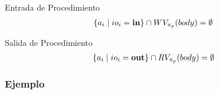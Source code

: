 \begin{Predicado}
\label{PPEntrada}
Entrada de Procedimiento
\begin{gather*}
\{ a_i \mid io_i = \mathbf{in} \} \cap WV_{\pi_{p}}(body) = \emptyset
\end{gather*}
\end{Predicado}

\begin{Predicado}
\label{PPSalida}
Salida de Procedimiento
\begin{gather*}
\{ a_i \mid io_i = \mathbf{out} \} \cap RV_{\pi_{p}}(body) = \emptyset
\end{gather*}
\end{Predicado}





\subsubsection{Ejemplo}

